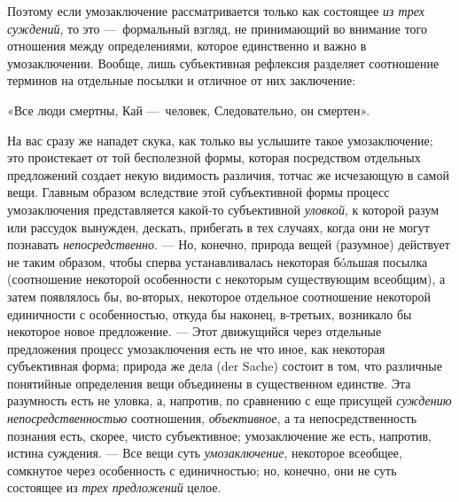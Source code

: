 \documentclass[twoside]{article}
\begin{document}
{{{Поэтому если умозаключение рассматривается только как
состоящее {\em из трех суждений},
то это —~формальный взгляд, не принимающий во
внимание того отношения между определениями, которое единственно и важно в
умозаключении. Вообще, лишь субъективная рефлексия разделяет соотношение
терминов на отдельные посылки и отличное от них заключение:

«Все люди смертны,
Кай —~человек,
Следовательно, он смертен».

На вас сразу же нападет скука, как только вы услышите такое
умозаключение; это проистекает от той бесполезной формы, которая
посредством отдельных предложений создает некую видимость различия, тотчас
же исчезающую в самой вещи. Главным образом вследствие этой субъективной
формы процесс умозаключения представляется какой-то субъективной
{\em уловкой}, к которой
разум или рассудок вынужден, дескать, прибегать в тех случаях, когда они не
могут познавать {\em непосредственно}.
— Но, конечно, природа вещей (разумное) действует не таким
образом, чтобы сперва устанавливалась некоторая бóльшая посылка
(соотношение некоторой особенности с некоторым существующим всеобщим), а
затем появлялось бы, во-вторых, некоторое отдельное соотношение некоторой
единичности с особенностью, откуда бы наконец, в-третьих, возникало бы
некоторое новое предложение. — \label{bkm:bm52a}Этот
движущийся через отдельные предложения процесс умозаключения есть не что
иное, как некоторая субъективная форма; природа же дела (der Sache) состоит
в том, что различные понятийные определения вещи объединены в существенном
единстве. Эта разумность есть не уловка, а, напротив, по сравнению с еще
присущей {\em суждению
непосредственностью} соотношения,
{\em объективное}, а та
непосредственность познания есть, скорее, чисто субъективное; умозаключение
же есть, напротив, истина суждения. — Все вещи суть
{\em умозаключение},
некоторое всеобщее, сомкнутое через особенность с
единичностью; но, конечно, они не суть состоящее из
{\em трех предложений}
целое.

}}}
\end{document}
